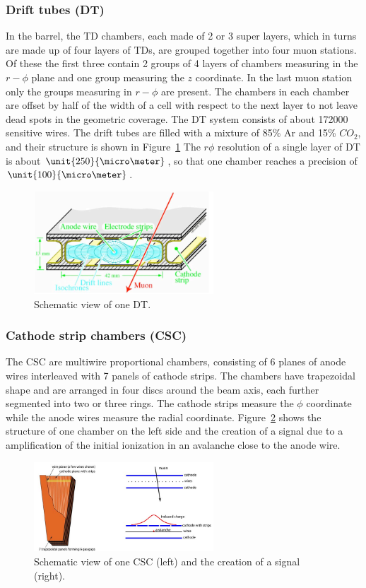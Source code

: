 \subsubsection*{Drift tubes (DT)}
In the barrel, the TD chambers, each made of 2 or 3 super layers, which in turns are made up of four layers of TDs, are grouped together into four muon stations. Of these the first three contain 2 groups of 4 layers of chambers measuring in the $r-\phi$ plane and one group measuring the $z$ coordinate. In the last muon station only the groups measuring in $r-\phi$ are present. The chambers in each chamber are offset by half of the width of a cell with respect to the next layer to not leave dead spots in the geometric coverage. The DT system consists of about 172000 sensitive wires. The drift tubes are filled with a mixture of 85\% Ar and 15\% $CO_2$, and their structure is shown in Figure~\ref{fig:DT} The $r\phi$ resolution of a single layer of DT is about $\unit{250}{\micro\meter}$, so that one chamber reaches a precision of $\unit{100}{\micro\meter}$.
\begin{figure}[htbp]
\centering
  \includegraphics[width=0.6\textwidth]{plots/CMS/DT.png}
\caption{Schematic view of one DT.}
\label{fig:DT}
\end{figure}  
\subsubsection*{Cathode strip chambers (CSC)}
The CSC are multiwire proportional chambers, consisting of 6 planes of anode wires interleaved with 7 panels of cathode strips. The chambers have trapezoidal shape and are arranged in four discs around the beam axis, each further segmented into two or three rings. The cathode strips measure the $\phi$ coordinate while the anode wires measure the radial coordinate. Figure~\ref{fig:CSC} shows the structure of one chamber on the left side and the creation of a signal due to a amplification of the initial ionization in an avalanche close to the anode wire. 
\begin{figure}[htbp]
\centering
  \includegraphics[width=0.6\textwidth]{plots/CMS/CSC.png}
\caption{Schematic view of one CSC (left) and the creation of a signal (right).}
\label{fig:CSC}
\end{figure}  
